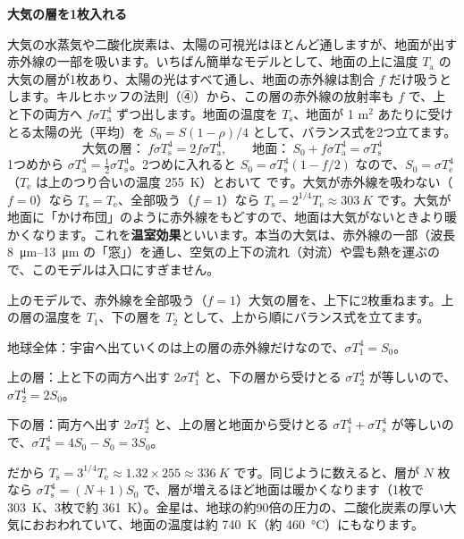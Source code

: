 \noindent\textbf{大気の層を1枚入れる}\par\nobreak
大気の水蒸気や二酸化炭素は、太陽の可視光はほとんど通しますが、地面が出す赤外線の一部を吸います。いちばん簡単なモデルとして、地面の上に温度 $T_{\mathrm a}$ の大気の層が1枚あり、太陽の光はすべて通し、地面の赤外線は割合 $f$ だけ吸うとします。キルヒホッフの法則（④）から、この層の赤外線の放射率も $f$ で、上と下の両方へ $f\sigma T_{\mathrm a}^4$ ずつ出します。地面の温度を $T_{\mathrm s}$、地面が 1 m$^2$ あたりに受けとる太陽の光（平均）を $S_0=S(1-\rho)/4$ として、バランス式を2つ立てます。
\[ \text{大気の層}：\ f\sigma T_{\mathrm s}^4=2f\sigma T_{\mathrm a}^4,\qquad \text{地面}：\ S_0+f\sigma T_{\mathrm a}^4=\sigma T_{\mathrm s}^4 \]
1つめから $\sigma T_{\mathrm a}^4=\tfrac12\sigma T_{\mathrm s}^4$。2つめに入れると $S_0=\sigma T_{\mathrm s}^4(1-f/2)$ なので、$S_0=\sigma T_{\mathrm e}^4$（$T_{\mathrm e}$ は上のつり合いの温度 \qty{255}{K}）とおいて
\label{ph:熱-13:onshitsu}です。大気が赤外線を吸わない（$f=0$）なら $T_{\mathrm s}=T_{\mathrm e}$、全部吸う（$f=1$）なら $T_{\mathrm s}=2^{1/4}T_{\mathrm e}\approx\qty{303}{K}$ です。大気が地面に「かけ布団」のように赤外線をもどすので、地面は大気がないときより暖かくなります。これを\textbf{温室効果}といいます。本当の大気は、赤外線の一部（波長 \qtyrange{8}{13}{\micro m} の「窓」）を通し、空気の上下の流れ（対流）や雲も熱を運ぶので、このモデルは入口にすぎません。

\begin{motto}[5]
上のモデルで、赤外線を全部吸う（$f=1$）大気の層を、上下に2枚重ねます。上の層の温度を $T_1$、下の層を $T_2$ として、上から順にバランス式を立てます。
\begin{enumerate}[label={\bkcircled[bkBlue]{\arabic*}}, leftmargin=2.4\zw, itemsep=1pt, topsep=2pt]
\item 地球全体：宇宙へ出ていくのは上の層の赤外線だけなので、$\sigma T_1^4=S_0$。
\item 上の層：上と下の両方へ出す $2\sigma T_1^4$ と、下の層から受けとる $\sigma T_2^4$ が等しいので、$\sigma T_2^4=2S_0$。
\item 下の層：両方へ出す $2\sigma T_2^4$ と、上の層と地面から受けとる $\sigma T_1^4+\sigma T_{\mathrm s}^4$ が等しいので、$\sigma T_{\mathrm s}^4=4S_0-S_0=3S_0$。
\end{enumerate}
だから $T_{\mathrm s}=3^{1/4}T_{\mathrm e}\approx1.32\times255\approx\qty{336}{K}$ です。同じように数えると、層が $N$ 枚なら $\sigma T_{\mathrm s}^4=(N+1)S_0$ で、層が増えるほど地面は暖かくなります（1枚で \qty{303}{K}、3枚で約 \qty{361}{K}）。金星は、地球の約90倍の圧力の、二酸化炭素の厚い大気におおわれていて、地面の温度は約 \qty{740}{K}（約 \qty{460}{\celsius}）にもなります。
\end{motto}

